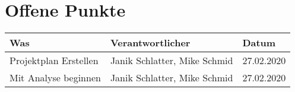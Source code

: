 \documentclass[
	ngerman,
	toc=listof, %
	toc=bibliography, %
	footnotes=multiple, %
	parskip=half, %
	numbers=noendperiod %
]{scrartcl}
\begin{document}
\section*{Offene Punkte}
\begin{tabularx}{0.9\linewidth}{Xll}
	\toprule
	Was & Verantwortlicher & Datum \\
	\midrule
	Projektplan Erstellen & Janik Schlatter, Mike Schmid & 27.02.2020 \\
	Mit Analyse beginnen & Janik Schlatter, Mike Schmid & 27.02.2020 \\
	\bottomrule
\end{tabularx}
\end{document}
